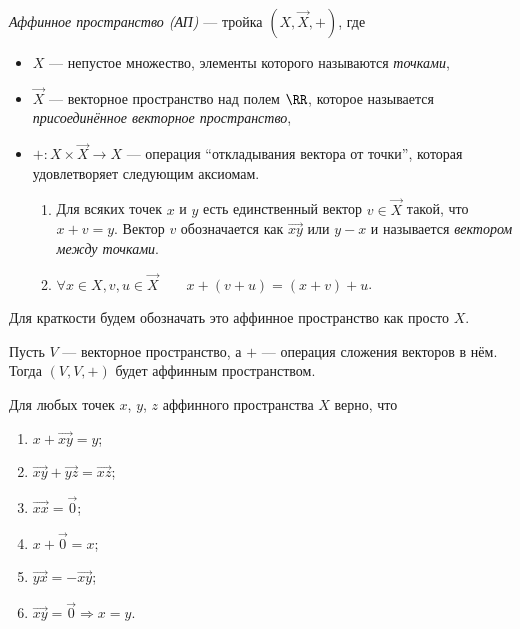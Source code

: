 \documentclass[12pt,a4paper]{article}
\begin{document}
    \begin{definition}
        \emph{Аффинное пространство (АП)} --- тройка $(X, \overrightarrow{X}, {+})$, где
        \begin{itemize}
            \item $X$ --- непустое множество, элементы которого называются \emph{точками},
            \item $\overrightarrow{X}$ --- векторное пространство над полем $\RR$, которое называется \emph{присоединённое векторное пространство},
            \item ${+}: X \times \overrightarrow{X} \to X$ --- операция ``откладывания вектора от точки'', которая удовлетворяет следующим аксиомам.
                \begin{enumerate}
                    \item Для всяких точек $x$ и $y$ есть единственный вектор $v \in \overrightarrow{X}$ такой, что $x + v = y$. Вектор $v$ обозначается как $\overrightarrow{xy}$ или $y - x$ и называется \emph{вектором между точками}.
                    \item $\forall x \in X, v, u \in \overrightarrow{X}\qquad x + (v + u) = (x + v) + u$.
                \end{enumerate}
        \end{itemize}

        Для краткости будем обозначать это аффинное пространство как просто $X$.
    \end{definition}

    \begin{example}
        Пусть $V$ --- векторное пространство, а $+$ --- операция сложения векторов в нём. Тогда $(V, V, {+})$ будет аффинным пространством.
    \end{example}

    \begin{lemma}
        Для любых точек $x$, $y$, $z$ аффинного пространства $X$ верно, что
        \begin{enumerate}
            \item $x + \overrightarrow{xy} = y$;
            \item $\overrightarrow{xy} + \overrightarrow{yz} = \overrightarrow{xz}$;
            \item $\overrightarrow{xx} = \overrightarrow{0}$;
            \item $x + \overrightarrow{0} = x$;
            \item $\overrightarrow{yx} = - \overrightarrow{xy}$;
            \item $\overrightarrow{xy} = \overrightarrow{0} \Rightarrow x = y$.
        \end{enumerate}
    \end{lemma}
\end{document}
